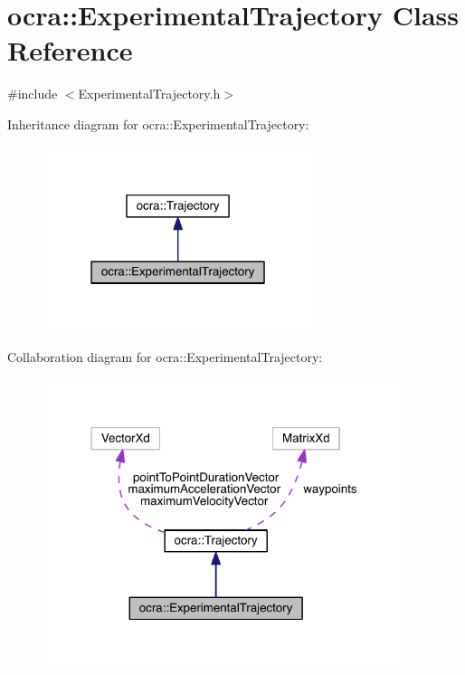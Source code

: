\hypertarget{classocra_1_1ExperimentalTrajectory}{}\section{ocra\+:\+:Experimental\+Trajectory Class Reference}
\label{classocra_1_1ExperimentalTrajectory}


{\ttfamily \#include $<$Experimental\+Trajectory.\+h$>$}



Inheritance diagram for ocra\+:\+:Experimental\+Trajectory\+:\nopagebreak
\begin{figure}[H]
\begin{center}
\leavevmode
\includegraphics[width=223pt]{da/dcb/classocra_1_1ExperimentalTrajectory__inherit__graph}
\end{center}
\end{figure}


Collaboration diagram for ocra\+:\+:Experimental\+Trajectory\+:\nopagebreak
\begin{figure}[H]
\begin{center}
\leavevmode
\includegraphics[width=301pt]{d6/d6c/classocra_1_1ExperimentalTrajectory__coll__graph}
\end{center}
\end{figure}
